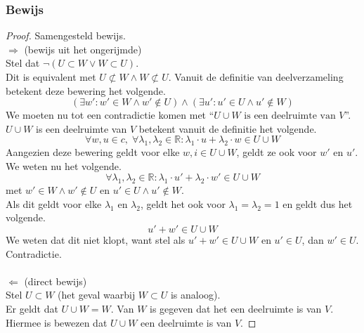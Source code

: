 \documentclass[lineaire_algebra_oplossingen.tex]{subfiles}
\begin{document}
\subsubsection*{Bewijs}
\begin{proof} Samengesteld bewijs.\\
$\Longrightarrow$ (bewijs uit het ongerijmde)\\ %
Stel dat $\neg(U \subset W \vee W \subset U)$.\\
Dit is equivalent met $U \not\subset W \wedge W \not\subset U$.
Vanuit de definitie van deelverzameling betekent deze bewering het volgende.
\[
(\exists w': w' \in W \wedge w' \not\in U) \wedge (\exists u': u' \in U \wedge u' \not\in W) 
\]
We moeten nu tot een contradictie komen met ``$U\cup W \text{ is een deelruimte van }V$''.
$U\cup W$ is een deelruimte van $V$ betekent vanuit de definitie het volgende.
\[
\forall w, u \in c,\; \forall \lambda_1 , \lambda_2 \in \mathbb{R}: \lambda_1\cdot u + \lambda_2\cdot w \in U\cup W
\]
Aangezien deze bewering geldt voor elke $w,i \in U\cup W$, geldt ze ook voor $w'$ en $u'$.
We weten nu het volgende.
\[
\forall \lambda_1 , \lambda_2 \in \mathbb{R}: \lambda_1\cdot u' + \lambda_2\cdot w' \in U\cup W
\]
met $w' \in W \wedge w' \not\in U$ en $u' \in U \wedge u' \not\in W$.\\
Als dit geldt voor elke $\lambda_1$ en $\lambda_2$, geldt het ook voor $\lambda_1= \lambda_2 = 1$ en geldt dus het volgende.
\[
u' + w' \in U \cup W
\]
We weten dat dit niet klopt, want stel als $u' + w' \in U \cup W$ en $u' \in U$, dan $w' \in U$. Contradictie.\\\\
$\Longleftarrow$ (direct bewijs)\\
Stel $U \subset W$ (het geval waarbij $W \subset U$ is analoog).\\
Er geldt dat $U\cup W = W$. Van $W$ is gegeven dat het een deelruimte is van $V$. Hiermee is bewezen dat $U\cup W$ een deelruimte is van $V$.
\end{proof}
\end{document}
